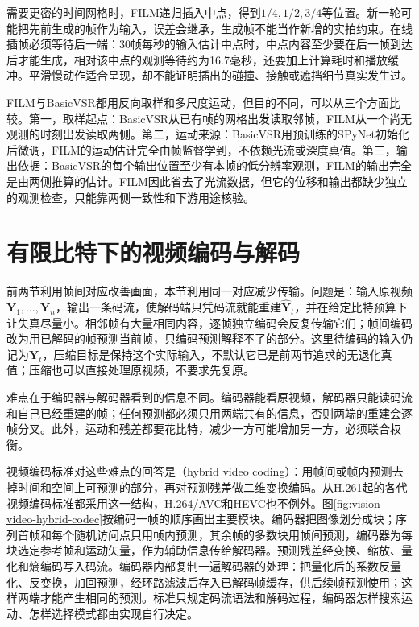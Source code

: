 需要更密的时间网格时，FILM递归插入中点，得到$1/4,1/2,3/4$等位置。新一轮可能把先前生成的帧作为输入，误差会继承，生成帧不能当作新增的实拍约束。在线插帧必须等待后一端：30帧每秒的输入估计中点时，中点内容至少要在后一帧到达后才能生成，相对该中点的观测等待约为16.7毫秒，还要加上计算耗时和播放缓冲。平滑慢动作适合呈现，却不能证明插出的碰撞、接触或遮挡细节真实发生过。

FILM与BasicVSR都用反向取样和多尺度运动，但目的不同，可以从三个方面比较。第一，取样起点：BasicVSR从已有帧的网格出发读取邻帧，FILM从一个尚无观测的时刻出发读取两侧。第二，运动来源：BasicVSR用预训练的SPyNet初始化后微调，FILM的运动估计完全由帧监督学到，不依赖光流或深度真值。第三，输出依据：BasicVSR的每个输出位置至少有本帧的低分辨率观测，FILM的输出完全是由两侧推算的估计。FILM因此省去了光流数据，但它的位移和输出都缺少独立的观测检查，只能靠两侧一致性和下游用途核验。

\section{有限比特下的视频编码与解码}
\label{sec:vision-video-codec}

前两节利用帧间对应改善画面，本节利用同一对应减少传输。问题是：输入原视频$\bm{Y}_1,\dots,\bm{Y}_n$，输出一条码流，使解码端只凭码流就能重建$\widehat{\bm{Y}}_t$，并在给定比特预算下让失真尽量小。相邻帧有大量相同内容，逐帧独立编码会反复传输它们；帧间编码改为用已解码的帧预测当前帧，只编码预测解释不了的部分。这里待编码的输入仍记为$\bm{Y}_t$，压缩目标是保持这个实际输入，不默认它已是前两节追求的无退化真值；压缩也可以直接处理原视频，不要求先复原。

难点在于编码器与解码器看到的信息不同。编码器能看原视频，解码器只能读码流和自己已经重建的帧；任何预测都必须只用两端共有的信息，否则两端的重建会逐帧分叉。此外，运动和残差都要花比特，减少一方可能增加另一方，必须联合权衡。

视频编码标准对这些难点的回答是（hybrid video coding）：用帧间或帧内预测去掉时间和空间上可预测的部分，再对预测残差做二维变换编码。从H.261起的各代视频编码标准都采用这一结构，H.264/AVC和HEVC也不例外。图\ref{fig:vision-video-hybrid-codec}按编码一帧的顺序画出主要模块。编码器把图像划分成块；序列首帧和每个随机访问点只用帧内预测，其余帧的多数块用帧间预测，编码器为每块选定参考帧和运动矢量，作为辅助信息传给解码器。预测残差经变换、缩放、量化和熵编码写入码流。编码器内部复制一遍解码器的处理：把量化后的系数反量化、反变换，加回预测，经环路滤波后存入已解码帧缓存，供后续帧预测使用；这样两端才能产生相同的预测。标准只规定码流语法和解码过程，编码器怎样搜索运动、怎样选择模式都由实现自行决定。

